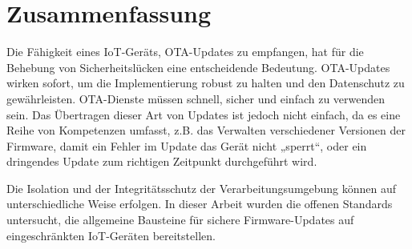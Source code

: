 \chapter{Zusammenfassung}
\label{sec:results}
Die Fähigkeit eines IoT-Geräts, OTA-Updates zu empfangen, hat für die Behebung von Sicherheitslücken eine entscheidende Bedeutung. OTA-Updates wirken sofort, um die Implementierung robust zu halten und den Datenschutz zu gewährleisten. OTA-Dienste müssen schnell, sicher und einfach zu verwenden sein. Das Übertragen dieser Art von Updates ist jedoch nicht einfach, da es eine Reihe von Kompetenzen umfasst, z.B. das Verwalten verschiedener Versionen der Firmware, damit ein Fehler im Update das Gerät nicht „sperrt“, oder ein dringendes Update zum richtigen Zeitpunkt durchgeführt wird.

Die Isolation und der Integritätsschutz der Verarbeitungsumgebung können auf unterschiedliche Weise erfolgen. In dieser Arbeit wurden die offenen Standards untersucht, die allgemeine Bausteine für sichere Firmware-Updates auf eingeschränkten IoT-Geräten bereitstellen. 